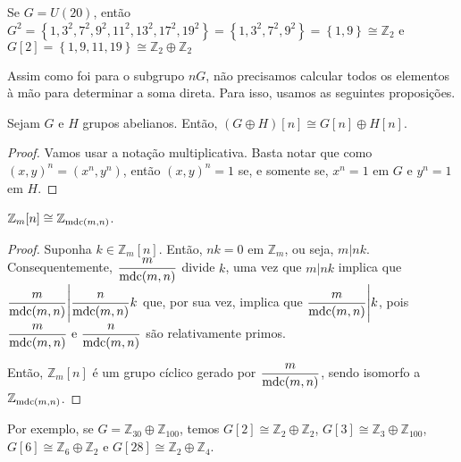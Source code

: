     	\par\vspace{0.3cm} Se $G = U(20)$, então 
    	$G^2 = \left\{ 1, 3^2, 7^2, 9^2, 11^2, 13^2, 17^2, 19^2 \right\} 
    	= \left\{ 1, 3^2, 7^2, 9^2 \right\} = \left\{ 1, 9 \right\}\cong\mathbb{Z}_2$ e 
    	$G[2] = \left\{ 1,9,11,19 \right\}\cong\mathbb{Z}_2\oplus\mathbb{Z}_2$
    	
    	\par\vspace{0.3cm} Assim como foi para o subgrupo $nG$, não precisamos calcular todos os 
    	elementos à mão para determinar a soma direta. Para isso, usamos as seguintes proposições.
    	\begin{prop}
    	\label{subgrupo abeliano G[n]}
    		Sejam $G$ e $H$ grupos abelianos. Então, $(G\oplus H)[n] \cong G[n]\oplus H[n]$.
    	\end{prop}
    	\begin{proof}
    		Vamos usar a notação multiplicativa. Basta notar que como $(x,y)^n = (x^n, y^n)$, 
    		então $(x,y)^n = 1$ se, e somente se, $x^n = 1$ em $G$ e $y^n = 1$ em $H$. 
    	\end{proof}
    	\begin{prop}
    	\label{regra G[n]}
    		$\mathbb{Z}_m[n]\cong \mathbb{Z}_{\operatorname{mdc}(m,n)}$.
    	\end{prop}
    	\begin{proof}
    		Suponha $k\in \mathbb{Z}_m[n]$. Então, $nk = 0$ em $\mathbb{Z}_m$, ou seja, $m|nk$. 
    		Consequentemente, $\displaystyle{ \frac{m}{\operatorname{mdc}(m,n)} }$ divide $k$, uma vez que $m|nk$ implica 
    		que $\displaystyle{ \frac{m}{\operatorname{mdc}(m,n)} \Bigg| \frac{n}{\operatorname{mdc}(m,n)}k  }$ que, por sua vez, implica 
    		que $\displaystyle{ \frac{m}{\operatorname{mdc}(m,n)} }\Bigg| k$, pois 
    		$\displaystyle{ \frac{m}{\operatorname{mdc}(m,n)}\text{ e }\frac{n}{\operatorname{mdc}(m,n)}  }$ são relativamente primos.
    		
    		\par\vspace{0.3cm} Então, $\mathbb{Z}_m[n]$ é um grupo cíclico gerado por
    		$\displaystyle{\frac{m}{\operatorname{mdc}(m,n)}}$, sendo isomorfo a $\mathbb{Z}_{\operatorname{mdc}(m,n)}$.
    	\end{proof}
    	\par\vspace{0.3cm} Por exemplo, se $G = \mathbb{Z}_{30}\oplus\mathbb{Z}_{100}$, 
    	temos $G[2]\cong \mathbb{Z}_2\oplus\mathbb{Z}_2$, $G[3]\cong \mathbb{Z}_3\oplus\mathbb{Z}_{100}$,
    	$G[6]\cong \mathbb{Z}_6\oplus\mathbb{Z}_2$ e $G[28]\cong \mathbb{Z}_{2}\oplus\mathbb{Z}_4$.
    	
